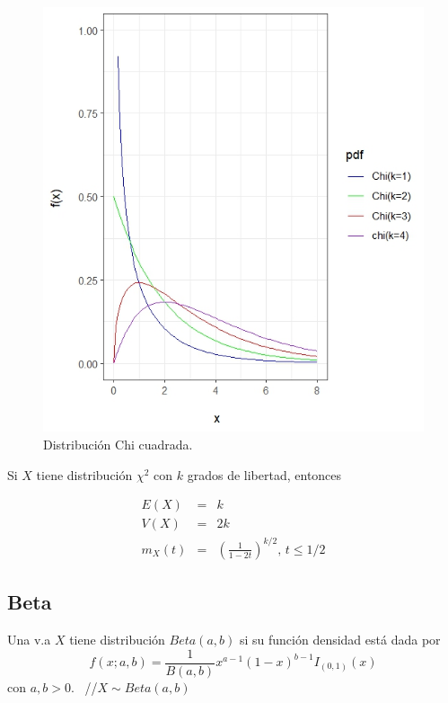 \begin{i}
\begin{figure}[h!]
\centering
\includegraphics[scale=1]{Figuras/Chi_cuadradas.jpeg}
\caption{Distribución Chi cuadrada.}
\end{figure}

\begin{theorem}
Si $X$ tiene distribución $\chi^2$ con $k$ grados de libertad, entonces

\begin{eqnarray*}
E(X) &=&k \\
V(X) &=&2k \\
m_{X}(t) &=&\left( \frac{1 }{1 -2t}\right)^{k/2}\text{, \ }t\leq 1/2
\end{eqnarray*}
\end{theorem}


\subsection{Beta}

\begin{definition}
Una v.a $X$ tiene distribución $Beta(a,b)$ si su función densidad está dada por 
\begin{equation*}
f(x;a,b)=\frac{1}{B(a,b)}x^{a-1}(1-x)^{b-1}I_{(0,1)}(x)
\end{equation*}
con $a,b>0.$ \ //$X\sim Beta(a,b)$
\end{definition}


\end{i}
